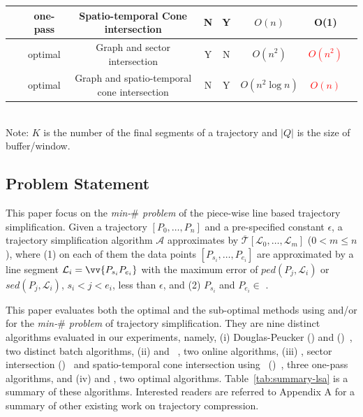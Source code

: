 \begin{table}
\begin{tabular}{|l|c|c|c|c|c|c|c|}
		\cised~\cite{Lin:Cised}	&one-pass	& Spatio-temporal Cone intersection        &N & Y & $O(n)$ & O(1) \\		\hline
		\oped~\cite{Chan:Optimal}	&optimal	& Graph and sector intersection    &Y & N & $O(n^2)$	& \textcolor{red}{$O(n^2)$} \\		\hline
		\osed~	&optimal	&Graph and spatio-temporal cone intersection&N & Y  & $O(n^2 \log n)$	& \textcolor{red}{$O(n)$} \\		\hline
	\end{tabular}
	{\\  Note: $K$ is the number of the final segments of a trajectory and $|Q|$ is the size of buffer/window.}
\end{table}


\subsection{Problem Statement}
This paper focus on the \emph{min-$\#$ problem} \cite{Chan:Optimal, Imai:Optimal,Pavlidis:Segment} of the piece-wise line based trajectory simplification.
%
Given a trajectory $[P_0, \dots, P_n]$ and a pre-specified constant $\epsilon$, a trajectory simplification algorithm $\mathcal{A}$ approximates  by $\overline{\mathcal{T}}[\mathcal{L}_0, \ldots , \mathcal{L}_m]$ ($0< m \le n$), where 
(1) on each of them the data points $[P_{s_i}, \dots, P_{e_i}]$ are approximated by a line segment $\mathcal{L}_i = \vv{P_{s_i}P_{e_i}}$ with the maximum error of  $ped(P_j, \mathcal{L}_i)$ or $sed(P_j, \mathcal{L}_i)$, $s_i < j<e_i$,  less than $\epsilon$, and 	%
(2) $P_{s_i}$ and $P_{e_i} \in$ . 	%

This paper evaluates both the optimal and the sub-optimal methods using \ped and/or \sed for the \emph{min-$\#$ problem} of trajectory simplification.
They are nine distinct \lsa algorithms evaluated in our experiments, namely,
(i) Douglas-Peucker (\dpa)\cite{Douglas:Peucker,Meratnia:Spatiotemporal} and \pavlidis (\tpa)~\cite{Pavlidis:Segment}, two distinct batch algorithms,
(ii) \bqsa\cite{Liu:BQS} and \squishe~\cite{Muckell:SQUISH}, two online algorithms, %
(iii) \operb\cite{Lin:Operb}, sector intersection (\siped)~\cite{Williams:Longest,Sklansky:Cone,Dunham:Cone, Zhao:Sleeve} and spatio-temporal cone intersection using \sed~(\cised)~\cite{Lin:Cised}, three one-pass algorithms, and 
(iv) \oped\cite{Chan:Optimal} and \osed, two optimal \lsa algorithms.
%
Table~\ref{tab:summary-lsa} is a summary of these algorithms.
Interested readers are referred to Appendix A for a summary of other existing work on trajectory compression.



